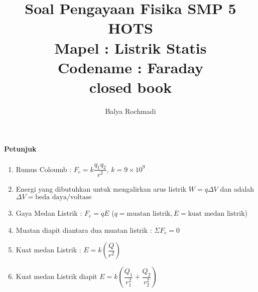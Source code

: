 \documentclass[12pt,a4paper,draft,final,oneside,twoside,openright,openany]{article}
\author{Balya Rochmadi}
\title{Soal Pengayaan Fisika SMP 5 HOTS\\ Mapel : Listrik Statis\\Codename : Faraday\\ \small closed book}
\begin{document}
	\Large

	\maketitle
		\noindent\makebox[\linewidth]{\rule{\paperwidth}{0.4pt}}
		\paragraph{
			\Large Petunjuk}
		
		\begin{enumerate}
			\item Rumus Coloumb	: $F_c=k\dfrac{q_1q_2}{r^2}$, $k=9\times 10^9$
			\item Energi yang dibutuhkan untuk mengalirkan arus listrik $W=q\Delta V$ dan  adalah $\Delta V=\text{beda daya/voltase}$
			\item Gaya Medan Listrik : $F_{e}=qE$ ($q=\text{muatan listrik}, E=\text{kuat medan listrik}$)
			\item Muatan diapit diantara dua muatan listrik : $\Sigma F_c=0$
			\item Kuat medan Listrik : $E=k(\dfrac{Q}{r^2})$
			\item Kuat medan Listrik diapit $E=k(\dfrac{Q_1}{r_1^2}+\dfrac{Q_2}{r_2^2})$
		\end{enumerate}
		\noindent\makebox[\linewidth]{\rule{\paperwidth}{0.4pt}}
\end{document}
